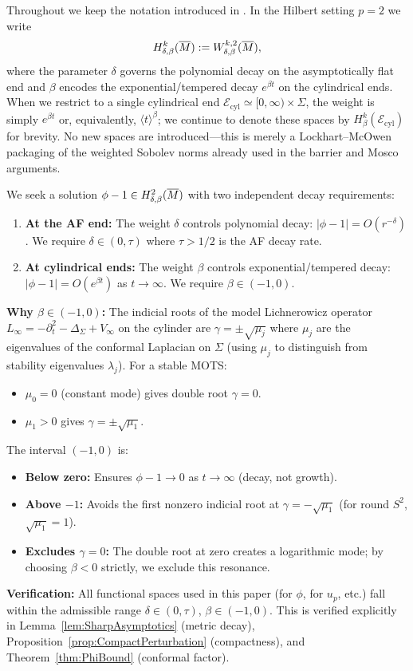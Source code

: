 Throughout we keep the notation introduced in .  In the Hilbert setting $p=2$ we write
\[
    H^{k}_{\delta,\beta}(\overline{M}) := W^{k,2}_{\delta,\beta}(\overline{M}),
\]
where the parameter $\delta$ governs the polynomial decay on the asymptotically flat end and $\beta$ encodes the exponential/tempered decay $e^{\beta t}$ on the cylindrical ends.  When we restrict to a single cylindrical end $\mathcal{E}_{\mathrm{cyl}} \simeq [0,\infty)\times \Sigma$, the weight is simply $e^{\beta t}$ or, equivalently, $\langle t \rangle^{\beta}$; we continue to denote these spaces by $H^{k}_{\beta}(\mathcal{E}_{\mathrm{cyl}})$ for brevity.  No new spaces are introduced---this is merely a Lockhart--McOwen packaging of the weighted Sobolev norms already used in the barrier and Mosco arguments.

\begin{remark}\label{rem:DecayRateRole}
We seek a solution $\phi-1 \in H^2_{\delta,\beta}(\overline{M})$ with two independent decay requirements:
\begin{enumerate}
    \item \textbf{At the AF end:} The weight $\delta$ controls polynomial decay: $|\phi - 1| = O(r^{-\delta})$. We require $\delta \in (0, \tau)$ where $\tau > 1/2$ is the AF decay rate.
    \item \textbf{At cylindrical ends:} The weight $\beta$ controls exponential/tempered decay: $|\phi - 1| = O(e^{\beta t})$ as $t \to \infty$. We require $\beta \in (-1, 0)$.
\end{enumerate}
\textbf{Why $\beta \in (-1, 0)$:} The indicial roots of the model Lichnerowicz operator $L_\infty = -\partial_t^2 - \Delta_\Sigma + V_\infty$ on the cylinder are $\gamma = \pm\sqrt{\mu_j}$ where $\mu_j$ are the eigenvalues of the conformal Laplacian on $\Sigma$ (using $\mu_j$ to distinguish from stability eigenvalues $\lambda_j$). For a stable MOTS:
\begin{itemize}
    \item $\mu_0 = 0$ (constant mode) gives double root $\gamma = 0$.
    \item $\mu_1 > 0$ gives $\gamma = \pm\sqrt{\mu_1}$.
\end{itemize}
The interval $(-1, 0)$ is:
\begin{itemize}
    \item \textbf{Below zero:} Ensures $\phi - 1 \to 0$ as $t \to \infty$ (decay, not growth).
    \item \textbf{Above $-1$:} Avoids the first nonzero indicial root at $\gamma = -\sqrt{\mu_1}$ (for round $S^2$, $\sqrt{\mu_1} = 1$).
    \item \textbf{Excludes $\gamma = 0$:} The double root at zero creates a logarithmic mode; by choosing $\beta < 0$ strictly, we exclude this resonance.
\end{itemize}
\textbf{Verification:} All functional spaces used in this paper (for $\phi$, for $u_p$, etc.) fall within the admissible range $\delta \in (0, \tau)$, $\beta \in (-1, 0)$. This is verified explicitly in Lemma~\ref{lem:SharpAsymptotics} (metric decay), Proposition~\ref{prop:CompactPerturbation} (compactness), and Theorem~\ref{thm:PhiBound} (conformal factor).
\end{remark}

